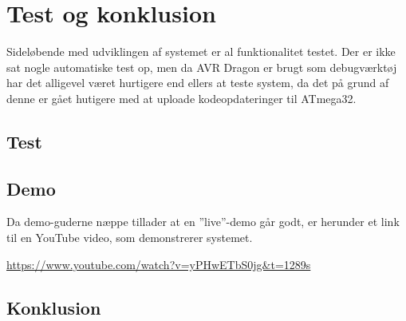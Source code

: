 \section{Test og konklusion}

Sideløbende med udviklingen af systemet er al funktionalitet testet. Der er ikke sat nogle automatiske test op, men da AVR Dragon er brugt som debugværktøj har det alligevel været hurtigere end ellers at teste system, da det på grund af denne er gået hutigere med at uploade kodeopdateringer til ATmega32.

\subsection{Test}


\subsection{Demo}
Da demo-guderne næppe tillader at en ''live''-demo går godt, er herunder et link til en YouTube video, som demonstrerer systemet.

\vskip 0.5cm
	\begin{center}
		\url{https://www.youtube.com/watch?v=yPHwETbS0jg&t=1289s}
	\end{center}
\vskip 0.5cm

\subsection{Konklusion}

